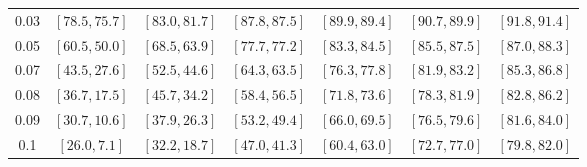 \documentclass{article}
\begin{document}
\begin{table}[htbp]
\begin{tabular}{c|cccccc}
0.03 &
$[78.5,75.7]$ &
$[83.0,81.7]$ &
$[87.8,87.5]$ &
$[89.9,89.4]$ &
$[90.7,89.9]$ &
$[91.8,91.4]$
\\

0.05 &
$[60.5,50.0]$ &
$[68.5,63.9]$ &
$[77.7,77.2]$ &
$[83.3,84.5]$ &
$[85.5,87.5]$ &
$[87.0,88.3]$
\\

0.07 &
$[43.5,27.6]$ &
$[52.5,44.6]$ &
$[64.3,63.5]$ &
$[76.3,77.8]$ &
$[81.9,83.2]$ &
$[85.3,86.8]$
\\

0.08 &
$[36.7,17.5]$ &
$[45.7,34.2]$ &
$[58.4,56.5]$ &
$[71.8,73.6]$ &
$[78.3,81.9]$ &
$[82.8,86.2]$
\\

0.09 &
$[30.7,10.6]$ &
$[37.9,26.3]$ &
$[53.2,49.4]$ &
$[66.0,69.5]$ &
$[76.5,79.6]$ &
$[81.6,84.0]$
\\

0.1 &
$[26.0,7.1]$ &
$[32.2,18.7]$ &
$[47.0,41.3]$ &
$[60.4,63.0]$ &
$[72.7,77.0]$ &
$[79.8,82.0]$
\\

\end{tabular}

\end{table}
\end{document}
